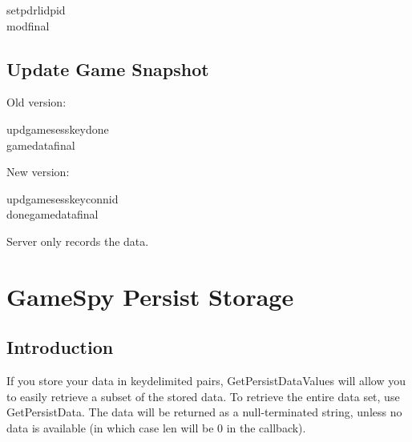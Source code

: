 \documentclass[oneside,titlepage,a4paper]{Definition/retrospy} %
\begin{document}
\ServerResponse

\begin{mybox}
	\tbs setpdr\tbs<success or fail>\tbs lid\tbs<local id>\tbs pid\tbs <profile id>\\\tbs mod\tbs <modified time>\tbs final\tbs
\end{mybox}

\section{Update Game Snapshot}
\ClientRequest

Old version:
\begin{mybox}
	\tbs updgame\tbs\tbs sesskey\tbs<session key>\tbs done\tbs<final flag>\\\tbs gamedata\tbs <game data>\tbs final\tbs
\end{mybox}

New version:
\begin{mybox}
		\tbs updgame\tbs\tbs sesskey\tbs<session key>\tbs connid\tbs<connection id>\\\tbs done\tbs<final flag>\tbs gamedata\tbs <game data>\tbs final\tbs
\end{mybox}

\ServerResponse

Server only records the data.


\chapter{GameSpy Persist Storage}
\section{Introduction}
If you store your data in key\value delimited pairs, GetPersistDataValues will
allow you to easily retrieve a subset of the stored data. To retrieve the entire
data set, use GetPersistData. The data will be returned as a null-terminated string,
unless no data is available (in which case len will be 0 in the callback).
\end{document}
